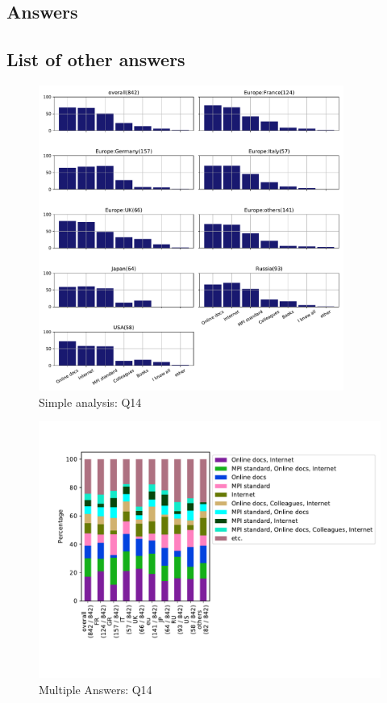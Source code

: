 
\subsection{Answers}



\subsection{List of other answers}
\begin{itemize}

\end{itemize}

\begin{figure}[htb]
\begin{center}
\includegraphics[width=10cm]{../pdfs/Q14.pdf}
\caption{Simple analysis: Q14}
\label{fig:Q14}
\end{center}
\end{figure}

\begin{figure}[htb]
\begin{center}
\includegraphics[width=14cm]{../pdfs/Q14-mans.pdf}
\caption{Multiple Answers: Q14}
\label{fig:Q14-mans}
\end{center}
\end{figure}

